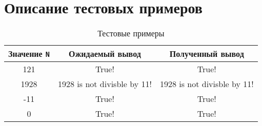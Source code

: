 \section{Описание тестовых примеров}

\begin{table}[H]
  \centering
  \begin{tabular}{|| c | c | c ||}
    \hline
    Значение \texttt{N} & Ожидаемый вывод & Полученный вывод \\
    \hline\hline
    121 & True! & True! \\
    \hline
    1928 & 1928 is not divisble by 11! & 1928 is not divisble by 11! \\
    \hline
    -11 & True! & True! \\
    \hline
    0 & True! & True! \\
    \hline
  \end{tabular}
  \caption{Тестовые примеры}
\end{table}

